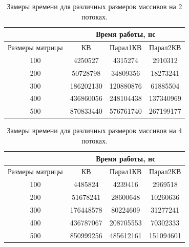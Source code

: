 \documentclass[12pt]{report}
\begin{document}
\begin{table}[h]
	\begin{center}
		\caption{\label{time2} Замеры времени для различных размеров массивов на 2 потоках.}
		\begin{tabular}{|c |c |c |c|} 
 			\hline
 			&\multicolumn{3}{|c|}{Время работы, нс}\\
 			\hline
			Размеры матрицы & КВ & Парал1КВ & Парал2КВ \\ [0.5ex] 
 			\hline\hline
 			100 & 4250527 & 4315274 & 2910312\\
 			\hline
 			200 & 50728798 & 34809356 & 18273241 \\
 			\hline
			300 & 186202130 & 120880876 & 61885504 \\
			\hline
			400 & 436860056 & 248104438 & 137340969 \\
			\hline
			500 & 870833440 & 576761740 & 267199177 \\
			\hline
			\end{tabular}
	\end{center}
\end{table}

\begin{table}[h]
	\begin{center}
		\caption{\label{time3} Замеры времени для различных размеров массивов на 4 потоках.}
		\begin{tabular}{|c |c |c |c|} 
 			\hline
 			&\multicolumn{3}{|c|}{Время работы, нс}\\
 			\hline
			Размеры матрицы & КВ & Парал1КВ & Парал2КВ \\ [0.5ex] 
 			\hline\hline
 			100 & 4485824 & 4239416 & 2969518 \\
 			\hline
 			200 & 51678241 & 28600648 & 10260636 \\
 			\hline
			300 & 176448578 & 80224609 & 31277241 \\
			\hline
			400 & 436787067 & 208705553 & 70302333 \\
			\hline
			500 & 850999256 & 485612161 & 151094601 \\
			\hline
			\end{tabular}
	\end{center}
\end{table}
\end{document}
